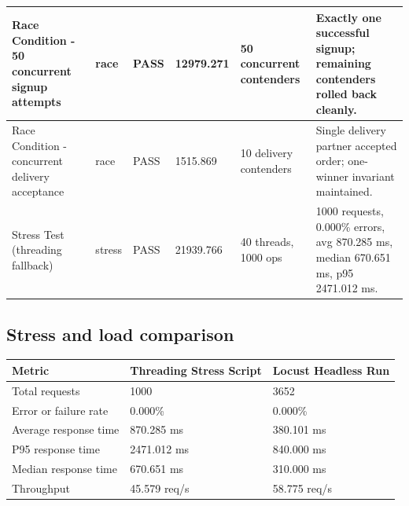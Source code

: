 \documentclass[a4paper, 11pt]{article}
\begin{document}
\begin{longtable}{|p{3.8cm}|p{1.4cm}|p{1.3cm}|p{1.7cm}|p{2.8cm}|p{4.6cm}|}
Race Condition - 50 concurrent signup attempts & race & PASS & 12979.271 & 50 concurrent contenders & Exactly one successful signup; remaining contenders rolled back cleanly. \\ \hline
Race Condition - concurrent delivery acceptance & race & PASS & 1515.869 & 10 delivery contenders & Single delivery partner accepted order; one-winner invariant maintained. \\ \hline
Stress Test (threading fallback) & stress & PASS & 21939.766 & 40 threads, 1000 ops & 1000 requests, 0.000\% errors, avg 870.285 ms, median 670.651 ms, p95 2471.012 ms. \\ \hline
\end{longtable}
\normalsize

\subsection{Stress and load comparison}
\renewcommand{\arraystretch}{1.3}
\begin{tabularx}{\textwidth}{|X|p{5.7cm}|p{5.7cm}|}
\hline
\rowcolor{HeaderGray}
\textbf{Metric} & \textbf{Threading Stress Script} & \textbf{Locust Headless Run} \\ \hline
Total requests & 1000 & 3652 \\ \hline
Error or failure rate & 0.000\% & 0.000\% \\ \hline
Average response time & 870.285 ms & 380.101 ms \\ \hline
P95 response time & 2471.012 ms & 840.000 ms \\ \hline
Median response time & 670.651 ms & 310.000 ms \\ \hline
Throughput & 45.579 req/s & 58.775 req/s \\ \hline
\end{tabularx}
\end{document}
